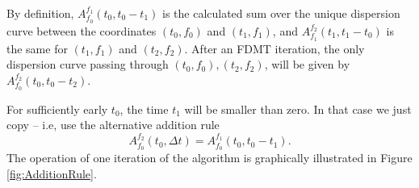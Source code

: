 \documentclass[iop]{emulateapj}
\begin{document}
By definition, $A_{f_0}^{f_1}(t_0,t_0-t_1)$ is the calculated sum over the unique dispersion curve between the coordinates $(t_0,f_0)$ and $(t_1,f_1)$, and $A_{f_1}^{f_2}(t_1,t_1-t_0)$ is the same for $(t_1,f_1)$ and $(t_2,f_2)$.
After an FDMT iteration, the only dispersion curve passing through $(t_0,f_0),(t_2,f_2)$, will be given by $A_{f_0}^{f_2}(t_0,t_0-t_2)$.

For sufficiently early $t_0$, the time $t_1$ will be smaller than zero. In that case we just copy -- i.e, use the alternative addition rule
\begin{equation}
A_{f_0}^{f_2}(t_0,\Delta t) = A_{f_0}^{f_1}(t_0,t_0 - t_1).
\end{equation}
The operation of one iteration of the algorithm is graphically illustrated in Figure \ref{fig:AdditionRule}.
\end{document}
